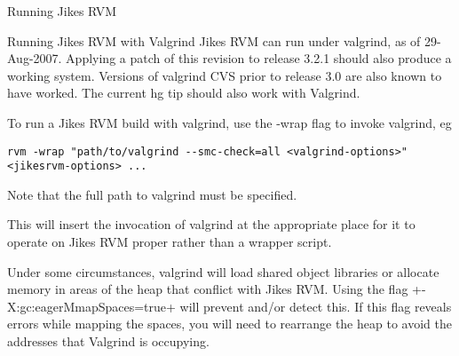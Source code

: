 \begin{section}{Running Jikes RVM}
\begin{subsection}{Running Jikes RVM with Valgrind}
Jikes RVM can run under valgrind, as of 29-Aug-2007. Applying a patch of this revision to release 3.2.1 should also produce a working system.  Versions of valgrind CVS prior to release 3.0 are also known to have worked. The current hg tip should also work with Valgrind.

To run a Jikes RVM build with valgrind, use the -wrap flag to invoke valgrind, eg
\begin{lstlisting}
rvm -wrap "path/to/valgrind --smc-check=all <valgrind-options>" <jikesrvm-options> ...
\end{lstlisting}

Note that the full path to valgrind must be specified.

This will insert the invocation of valgrind at the appropriate place for it to operate on Jikes RVM proper rather than a wrapper script. 

Under some circumstances, valgrind will load shared object libraries or allocate memory in areas of the heap that conflict with Jikes RVM.  Using the flag \spverb+-X:gc:eagerMmapSpaces=true+ will prevent and/or detect this.  If this flag reveals errors while mapping the spaces, you will need to rearrange the heap to avoid the addresses that Valgrind is occupying.

\end{subsection}

\end{section}